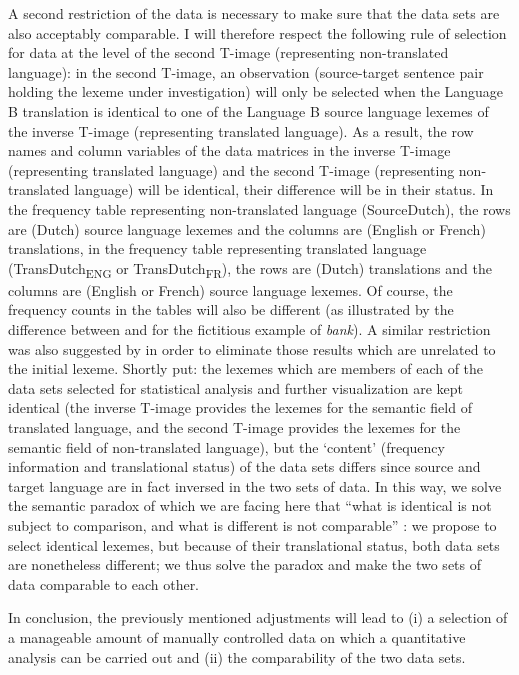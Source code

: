 A second restriction of the data is necessary to make sure that the data sets are also acceptably comparable. I will therefore respect the following rule of selection for data at the level of the second T-image (representing non-translated language): in the second T-image, an observation (source-target sentence pair holding the lexeme under investigation) will only be selected when the Language B translation is identical to one of the Language B source language lexemes of the inverse T-image (representing translated language). As a result, the row names and column variables of the data matrices in the inverse T-image (representing translated language) and the second T-image (representing non-translated language) will be identical, their difference will be in their status. In the frequency table representing non-translated language (SourceDutch), the rows are (Dutch) source language lexemes and the columns are (English or French) translations, in the frequency table representing translated language (TransDutch\textsubscript{ENG} or TransDutch\textsubscript{FR}), the rows are (Dutch) translations and the columns are (English or French) source language lexemes. Of course, the frequency counts in the tables will also be different (as illustrated by the difference between  and  for the fictitious example of \textit{bank}). A similar restriction was also suggested by \citet[60]{johansson_translational_1998} in order to eliminate those results which are unrelated to the initial lexeme. Shortly put: the lexemes which are members of each of the data sets selected for statistical analysis and further visualization are kept identical (the inverse T-image provides the lexemes for the semantic field of translated language, and the second T-image provides the lexemes for the semantic field of non-translated language), but the ‘content’ (frequency information and translational status) of the data sets differs since source and target language are in fact inversed in the two sets of data. In this way, we solve the semantic paradox of \citet{krzeszowski_contrasting_1990} which we are facing here that “what is identical is not subject to comparison, and what is different is not comparable” \citep[7]{krzeszowski_contrasting_1990}: we propose to select identical lexemes, but because of their translational status, both data sets are nonetheless different; we thus solve the paradox and make the two sets of data comparable to each other.

In conclusion, the previously mentioned adjustments will lead to (i) a selection of a manageable amount of manually controlled data on which a quantitative analysis can be carried out and (ii) the comparability of the two data sets.

